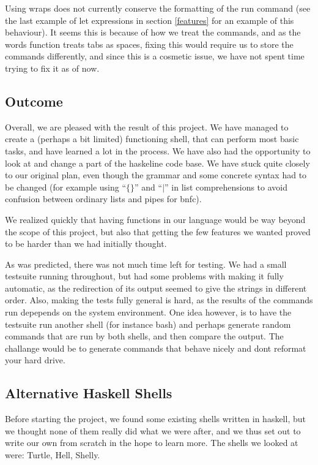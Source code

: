 \documentclass[11pt,a4paper]{article}
\begin{document}
Using wraps does not currently conserve the formatting of the run command (see
the last example of let expressions in section \ref{features} for an example of
this behaviour). It seems this is because of how we treat the commands, and as
the words function treats tabs as spaces, fixing this would require us to store
the commands differently, and since this is a cosmetic issue, we have not spent
time trying to fix it as of now.

\subsection{Outcome}

Overall, we are pleased with the result of this project. We have managed to
create a (perhaps a bit limited) functioning shell, that can perform most basic
tasks, and have learned a lot in the process. We have also had the opportunity
to look at and change a part of the haskeline code base. We have stuck quite
closely to our original plan, even though the grammar and some concrete syntax
had to be changed (for example using ``$\{\}$'' and ``$|$'' in list comprehensions
to avoid confusion between ordinary lists and pipes for bnfc).

We realized quickly that having functions in our language would be way beyond
the scope of this project, but also that getting the few features we wanted
proved to be harder than we had initially thought.

As was predicted, there was not much time left for testing. We had a small
testsuite running throughout, but had some problems with making it fully
automatic, as the redirection of its output seemed to give the strings in
different order. Also, making the tests fully general is hard, as the results
of the commands run depepends on the system environment. One idea however, is
to have the testsuite run another shell (for instance bash) and perhaps
generate random commands that are run by both shells, and then compare the
output. The challange would be to generate commands that behave nicely and dont
reformat your hard drive.

\subsection{Alternative Haskell Shells}

Before starting the project, we found some existing shells written in haskell, but we thought none of them really did what we were after, and we thus set out to write our own from scratch in the hope to learn more. The shells we looked at were: Turtle, Hell, Shelly.
\end{document}
